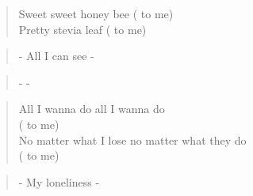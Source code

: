 \begin{verse}
Sweet sweet honey bee ( to me)\\
Pretty stevia leaf ( to me)
\end{verse}

\begin{verse}
- All I can see -
\end{verse}

\begin{verse}
-  -
\end{verse}

\begin{verse}
All I wanna do all I wanna do \\
( to me)\\
No matter what I lose no matter what they do \\
( to me)
\end{verse}

\begin{verse}
- My loneliness -
\end{verse}

\clearpage
